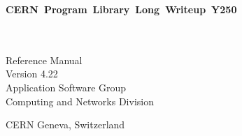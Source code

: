 
 
\begin{titlepage}
\notHTML{\vspace*{-23mm}}%
%
%
\hfill
{}\hbox{\Large\bf CERN Program Library Long Writeup Y250}
\hfill\mbox{}
\begin{center}
\mbox{}\\[10mm]
\mbox{}\\[2cm]
{\LARGE Reference Manual}\\[2cm]
{\LARGE Version 4.22}\\[3cm]
{\Large Application Software Group}\\[1cm]
{\Large Computing and Networks Division}\\[2cm]
\end{center}
\notHTML{\vfill}%
\begin{center}\Large CERN Geneva, Switzerland\end{center}
\end{titlepage}

